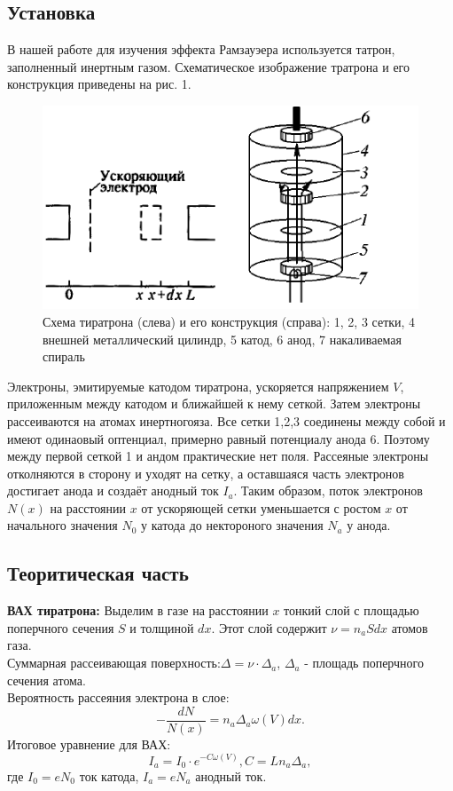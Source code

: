 \documentclass[a4paper,12pt]{article}
\theoremstyle{plain} %
\theoremstyle{definition} %
\theoremstyle{remark} %
\begin{document}
\subsection{Установка}
\indent В нашей работе для изучения эффекта Рамзауэера используется татрон, заполненный инертным газом. Схематическое изображение тратрона и его конструкция приведены на рис. 1.
\begin{figure}
    \vspace{-100pt}
    \begin{center}
        \includegraphics[width=0.89 \textwidth]{pic1.png}
    \end{center}
    \caption{Схема тиратрона (слева) и его конструкция (справа): 1, 2, 3 сетки, 4 внешней металлический цилиндр, 5 катод, 6 анод, 7 накаливаемая спираль}
\end{figure}
\indent Электроны, эмитируемые катодом тиратрона, ускоряется напряжением $V$, приложенным между катодом и ближайшей к нему сеткой. Затем электроны рассеиваются на атомах инертногояза. Все сетки 1,2,3 соединены между собой и имеют одинаовый оптенциал, примерно равный потенциалу анода 6. Поэтому между первой сеткой 1 и андом практические нет поля. 
\indent Рассеяные электроны отколняются в сторону и уходят на сетку, а оставшаяся часть электронов достигает анода и создаёт анодный ток $I_a$. Таким образом, поток электронов $N(x)$ на расстоянии $x$ от ускоряющей сетки уменьшается с ростом $x$ от начального значения $N_0$ у катода до нектороного значения $N_a$ у анода.
\subsection{Теоритическая часть}
\textbf{ВАХ тиратрона:} Выделим в газе на расстоянии $x$ тонкий слой с площадью поперчного сечения $S$ и толщиной $dx$. Этот слой содержит $\nu = n_a S dx$ атомов газа.\\
\indent Суммарная рассеивающая поверхность:$\Delta =\nu \cdot \Delta_a$, $\Delta_a$ - площадь поперчного сечения атома.\\
\indent Вероятность рассеяния электрона в слое:
\[- \dfrac{dN}{N(x)} = n_a \Delta_a \omega(V) dx.\]
Итоговое уравнение для ВАХ:
\[I_a = I_0 \cdot e^{- C \omega(V)}, C = Ln_a\Delta_a, \]
где $I_0 = eN_0$ ток катода, $I_a = eN_a$ анодный ток.
\end{document}
